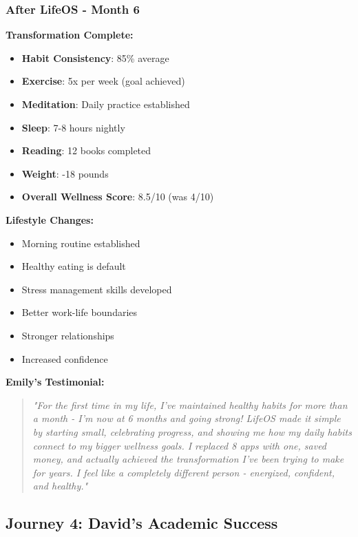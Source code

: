\subsubsection{After LifeOS - Month 6}

\textbf{Transformation Complete:}

\begin{itemize}
    \item \textbf{Habit Consistency}: 85\% average
    \item \textbf{Exercise}: 5x per week (goal achieved)
    \item \textbf{Meditation}: Daily practice established
    \item \textbf{Sleep}: 7-8 hours nightly
    \item \textbf{Reading}: 12 books completed
    \item \textbf{Weight}: -18 pounds
    \item \textbf{Overall Wellness Score}: 8.5/10 (was 4/10)
\end{itemize}

\textbf{Lifestyle Changes:}
\begin{itemize}
    \item Morning routine established
    \item Healthy eating is default
    \item Stress management skills developed
    \item Better work-life boundaries
    \item Stronger relationships
    \item Increased confidence
\end{itemize}

\textbf{Emily's Testimonial:}
\begin{quote}
\textit{"For the first time in my life, I've maintained healthy habits for more than a month - I'm now at 6 months and going strong! LifeOS made it simple by starting small, celebrating progress, and showing me how my daily habits connect to my bigger wellness goals. I replaced 8 apps with one, saved money, and actually achieved the transformation I've been trying to make for years. I feel like a completely different person - energized, confident, and healthy."}
\end{quote}

\subsection{Journey 4: David's Academic Success}

